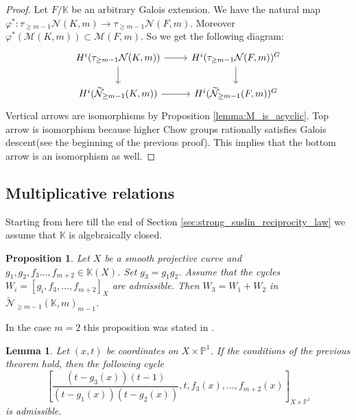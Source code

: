 \documentclass[12pt]{extarticle}
\newtheorem{lemma}[theorem]{Lemma}
\newtheorem{proposition}[theorem]{Proposition}
\newtheorem{remark}[theorem]{Remark}
\def\mb{\mathbb}
\def\mc{\mathcal}
\def\L{\Lambda}
\def\k{\mb K}
\def\ph{\varphi}
\def\t{\times}
\def\cl{\colon}
\def\wt{\widetilde}
\renewcommand{\P}{{\mb P}}
\def\W{\mc W}
\def \tW{\wt{\W}}
\def \wW{\tW}
\def \CH{\mc{N}}
\def \wCH{\wt{\CH}_{\geq m-1}}
\def \M{\mc M}
\begin{document}
\begin{proof}

Let $F/\k$ be an arbitrary Galois extension. We have the natural map $\ph^*\cl \tau_{\geq m-1}\CH(K,m)\to \tau_{\geq m-1}\CH(F,m)$. Moreover $\ph^*(\M(K,m))\subset \M(F,m)$. So we get the following diagram:
    \begin{equation}
        \begin{tikzcd}
             H^i(\tau_{\geq m-1}\CH(K,m)) \ar[r]\ar[d] & H^i(\tau_{\geq m-1}\CH(F,m))^G\ar[d]\\
             H^i(\wCH(K,m)) \ar[r]& H^i(\wCH(F,m))^G
        \end{tikzcd}
        \end{equation}
    Vertical arrows are isomorphisms by Proposition \ref{lemma:M_is_acyclic}. Top arrow is isomorphism because higher Chow groups rationally satisfies Galois descent(see the beginning of the previous proof). This implies that the bottom arrow is an isomorphism as well.
\end{proof}





\subsection{Multiplicative relations}
Starting from here till the end of Section \ref{sec:strong_suslin_reciprocity_law} we assume that $\k$ is algebraically closed.
\begin{proposition}
\label{prop:multiplicative_relations_Chow}
    Let $X$ be a smooth projective curve and $g_1, g_2, f_3\dots, f_{m+2}\in \k(X)$. Set $g_3=g_1g_2$. Assume that the cycles $W_i=[g_i,f_3,\dots, f_{m+2}]_X$ are admissible. Then $W_3=W_1+W_2$ in $\wCH(\k,m)_{m-1}$.
\end{proposition}

In the case $m=2$ this proposition was stated in \cite[Lemma 2.2]{cubical1999herbert}. 





\begin{lemma}
    Let $(x,t)$ be coordinates on $X\t\P^1$. If the conditions of the previous theorem hold, then the following cycle
        $$\left[\dfrac{(t-g_3(x))(t-1)}{(t-g_1(x))(t-g_2(x))},t, f_3(x),\dots, f_{m+2}(x)\right]_{X\t\P^1}$$
    is admissible.
\end{lemma}
\end{document}
